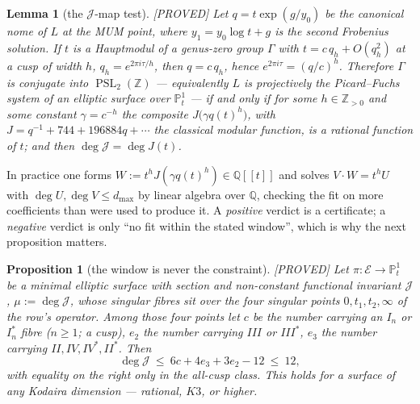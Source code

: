 \documentclass[11pt,reqno]{amsart}
\theoremstyle{plain}
\newtheorem{proposition}[theorem]{Proposition}
\newtheorem{lemma}[theorem]{Lemma}
\theoremstyle{definition}
\theoremstyle{remark}
\theoremstyle{plain}
\newcommand{\Z}{\mathbb{Z}}
\newcommand{\Q}{\mathbb{Q}}
\newcommand{\PP}{\mathbb{P}}
\DeclareMathOperator{\PSL}{PSL}
\newcommand{\Proved}{\textup{\textsf{[PROVED]}}}
\begin{document}
\begin{lemma}[the $\mathcal J$-map test]\label{lem:jtest}
\Proved{} Let $q=t\exp(g/y_0)$ be the canonical nome of $L$ at the MUM point,
where $y_1=y_0\log t+g$ is the second Frobenius solution. If $t$ is a Hauptmodul
of a genus-zero group $\Gamma$ with $t=c\,q_h+O(q_h^2)$ at a cusp of width $h$,
$q_h=e^{2\pi i\tau/h}$, then $q=c\,q_h$, hence $e^{2\pi i\tau}=(q/c)^h$.
Therefore $\Gamma$ is conjugate into $\PSL_2(\Z)$ --- equivalently $L$ is
projectively the Picard--Fuchs system of an elliptic surface over $\PP^1_t$ ---
if and only if for some $h\in\Z_{>0}$ and some constant $\gamma=c^{-h}$ the
composite $J\bigl(\gamma q(t)^h\bigr)$, with $J=q^{-1}+744+196884q+\cdots$ the
classical modular function, is a rational function of $t$; and then
$\deg\mathcal J=\deg J(t)$.
\end{lemma}

In practice one forms $W:=t^{h}J(\gamma q(t)^h)\in\Q[[t]]$ and solves
$V\cdot W=t^{h}U$ with $\deg U,\deg V\le d_{\max}$ by linear algebra over $\Q$,
checking the fit on more coefficients than were used to produce it. A
\emph{positive} verdict is a certificate; a \emph{negative} verdict is only ``no
fit within the stated window'', which is why the next proposition matters.

\begin{proposition}[the window is never the constraint]\label{prop:K1}
\Proved{} Let $\pi:\mathcal E\to\PP^1_t$ be a minimal elliptic surface with
section and non-constant functional invariant $\mathcal J$, $\mu:=\deg\mathcal J$,
whose singular fibres sit over the four singular points $0,t_1,t_2,\infty$ of the
row's operator. Among those four points let $c$ be the number carrying an
$I_n$ or $I_n^*$ fibre \textup{(}$n\ge1$; a cusp\textup{)}, $e_2$ the number
carrying $III$ or $III^*$, $e_3$ the number carrying $II,IV,IV^*,II^*$. Then
\[
\deg\mathcal J\ \le\ 6c+4e_3+3e_2-12\ \le\ 12 ,
\]
with equality on the right only in the all-cusp class. This holds for a surface
of any Kodaira dimension --- rational, $K3$, or higher.
\end{proposition}
\end{document}

